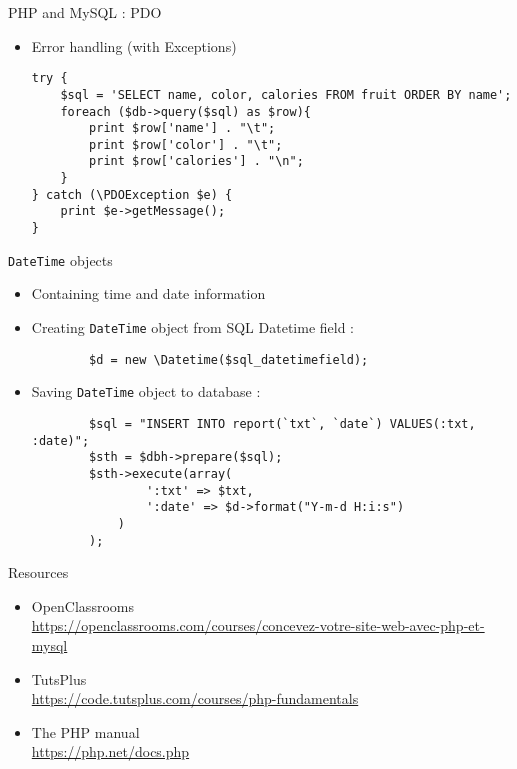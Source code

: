 \documentclass{beamer}
\begin{document}
\begin{frame}[fragile]{PHP and MySQL : PDO}
    \begin{itemize}
\item Error handling (with Exceptions)
            \begin{lstlisting}
try {
    $sql = 'SELECT name, color, calories FROM fruit ORDER BY name';
    foreach ($db->query($sql) as $row){
        print $row['name'] . "\t";
        print $row['color'] . "\t";
        print $row['calories'] . "\n";
	}
} catch (\PDOException $e) {
	print $e->getMessage();
}
            \end{lstlisting}
    \end{itemize}
\end{frame}

\begin{frame}[fragile]{\texttt{DateTime} objects}
    \begin{itemize}
	\item Containing time and date information
	\item Creating \texttt{DateTime} object from SQL Datetime field :
	\begin{lstlisting}
		$d = new \Datetime($sql_datetimefield);
	\end{lstlisting}
	\item Saving \texttt{DateTime} object to database :
	\begin{lstlisting}
		$sql = "INSERT INTO report(`txt`, `date`) VALUES(:txt, :date)";
		$sth = $dbh->prepare($sql);
		$sth->execute(array(
				':txt' => $txt,
				':date' => $d->format("Y-m-d H:i:s")
			)
		);
	\end{lstlisting}
\end{itemize}
\end{frame}

\begin{frame}[fragile]{Resources}
\begin{itemize}
	\item OpenClassrooms \\ \url{https://openclassrooms.com/courses/concevez-votre-site-web-avec-php-et-mysql}
	\item TutsPlus \\ \url{https://code.tutsplus.com/courses/php-fundamentals}
	\item The PHP manual \\ \url{https://php.net/docs.php}
\end{itemize}
\end{frame}
\end{document}
